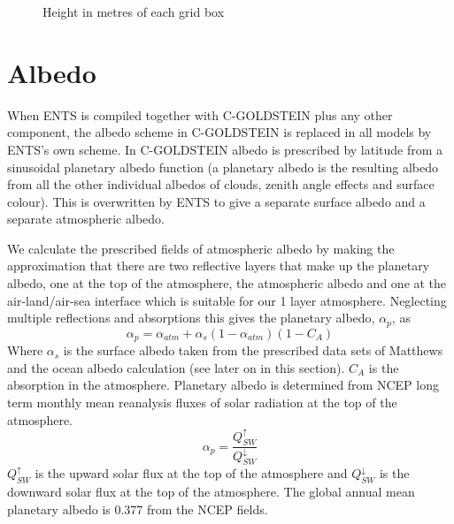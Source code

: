 \documentclass[10pt,a4paper]{report}
\begin{document}
\begin{figure}
\centerline{}
\caption{Height in metres of each grid box}\label{elevation}
\end{figure}

\section{Albedo}\label{albedo section}

When ENTS is compiled together with C-GOLDSTEIN plus any other
component, the albedo scheme in C-GOLDSTEIN is replaced in all
models by ENTS's own scheme. In C-GOLDSTEIN albedo is prescribed by
latitude from a sinusoidal planetary albedo function (a planetary
albedo is the resulting albedo from all the other individual albedos
of clouds, zenith angle effects and surface colour). This is
overwritten by ENTS to give a separate surface albedo and a separate
atmospheric albedo.

We calculate the prescribed fields of atmospheric albedo by making
the approximation that there are two reflective layers that make up
the planetary albedo, one at the top of the atmosphere, the
atmospheric albedo and one at the air-land/air-sea interface which
is suitable for our 1 layer atmosphere. Neglecting multiple
reflections and absorptions this gives the planetary albedo,
$\alpha_p$, as
\begin{equation}\label{planet albedo}
\alpha_p = \alpha_{atm} + \alpha_s (1-\alpha_{atm})(1-C_A)
\end{equation}
Where $\alpha_s$ is the surface albedo taken from the prescribed
data sets of Matthews \cite{Matthews} and the ocean albedo
calculation (see later on in this section). $C_A$ is the absorption
in the atmosphere. Planetary albedo is determined from NCEP long
term monthly mean reanalysis fluxes of solar radiation at the top of
the atmosphere.
\begin{equation}
\alpha_p=\frac{Q_{SW}^{\uparrow}}{Q_{SW}^{\downarrow}}
\end{equation}
$Q_{SW}^{\uparrow}$ is the upward solar flux at the top of the
atmosphere and $Q_{SW}^{\downarrow}$ is the downward solar flux at
the top of the atmosphere. The global annual mean planetary albedo
is 0.377 from the NCEP fields.
\end{document}
